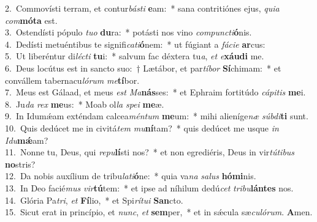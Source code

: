 {2.~}Commovísti terram, et contur\textit{bá}\textit{sti} \textbf{e}am:~* sana contritiónes ejus, \textit{qui}\textit{a} \textit{com}\textbf{mó}\textbf{ta} est.\\
{3.~}Ostendísti pópulo \textit{tu}\textit{o} \textbf{du}ra:~* potásti nos vino \textit{com}\textit{pun}\textit{cti}\textbf{ó}nis.\\
{4.~}Dedísti metuéntibus te signifi\textit{ca}\textit{ti}\textbf{ó}nem:~* ut fúgiant a \textit{fá}\textit{ci}\textit{e} \textbf{ar}cus:\\
{5.~}Ut liberéntur di\textit{lé}\textit{cti} \textbf{tu}i:~* salvum fac déxtera tu\textit{a}, \textit{et} \textit{e}\textbf{xáu}\textbf{di} me.\\
{6.~}Deus locútus est in sancto suo:~† Lætábor, et par\textit{tí}\textit{bor} \textbf{Sí}chimam:~* et convállem tabernacu\textit{ló}\textit{rum} \textit{me}\textbf{tí}bor.\\
{7.~}Meus est Gálaad, et meus \textit{est} \textit{Ma}\textbf{nás}ses:~* et Ephraim fortitúdo \textit{cá}\textit{pi}\textit{tis} \textbf{me}i.\\
{8.~}Ju\textit{da} \textit{rex} \textbf{me}us:~* Moab ol\textit{la} \textit{spe}\textit{i} \textbf{me}æ.\\
{9.~}In Idumǽam exténdam calcea\textit{mén}\textit{tum} \textbf{me}um:~* mihi alieníge\textit{næ} \textit{súb}\textit{di}\textbf{ti} sunt.\\
{10.~}Quis dedúcet me in civitá\textit{tem} \textit{mu}\textbf{ní}tam?~* quis dedúcet me usque \textit{in} \textit{I}\textit{du}\textbf{mǽ}am?\\
{11.~}Nonne tu, Deus, qui \textit{re}\textit{pu}\textbf{lí}sti nos?~* et non egrediéris, Deus in vir\textit{tú}\textit{ti}\textit{bus} \textbf{no}stris?\\
{12.~}Da nobis auxílium de tribu\textit{la}\textit{ti}\textbf{ó}ne:~* quia va\textit{na} \textit{sa}\textit{lus} \textbf{hó}\textbf{mi}nis.\\
{13.~}In Deo facié\textit{mus} \textit{vir}\textbf{tú}tem:~* et ipse ad níhilum dedú\textit{cet} \textit{tri}\textit{bu}\textbf{lán}\textbf{tes} nos.\\
{14.~}Glória Pa\textit{tri}, \textit{et} \textbf{Fí}lio,~* et Spi\textit{rí}\textit{tu}\textit{i} \textbf{San}cto.\\
{15.~}Sicut erat in princípio, et \textit{nunc}, \textit{et} \textbf{sem}per,~* et in sǽcula sæ\textit{cu}\textit{ló}\textit{rum}. \textbf{A}men.\\
